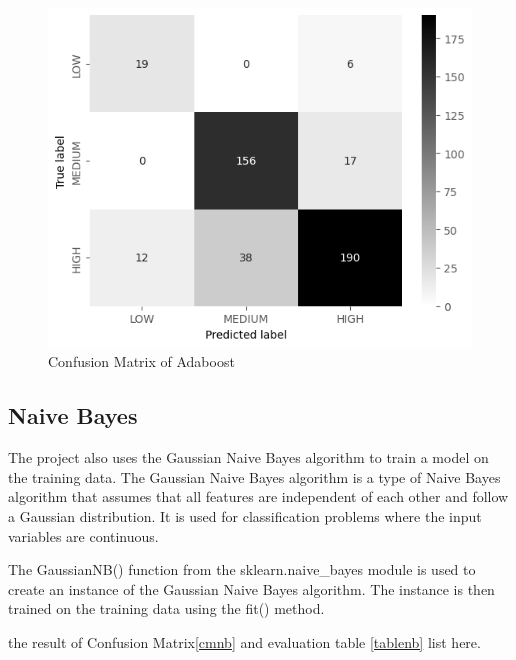     \begin{figure}[H]
        \includegraphics[scale=0.7]{imgs/adb_cm.png}
        \centering
        \caption{Confusion Matrix of Adaboost}
        \label{cmadb}
    \end{figure}


\subsection{Naive Bayes}

The project also uses the Gaussian Naive Bayes algorithm to train a model on the training data. The Gaussian Naive Bayes algorithm is a type of Naive Bayes algorithm that assumes that all features are independent of each other and follow a Gaussian distribution. It is used for classification problems where the input variables are continuous.

The GaussianNB() function from the sklearn.naive\_bayes module is used to create an instance of the Gaussian Naive Bayes algorithm. The instance is then trained on the training data using the fit() method.

the result of Confusion Matrix\ref*{cmnb} and evaluation table \ref*{tablenb} list here.


